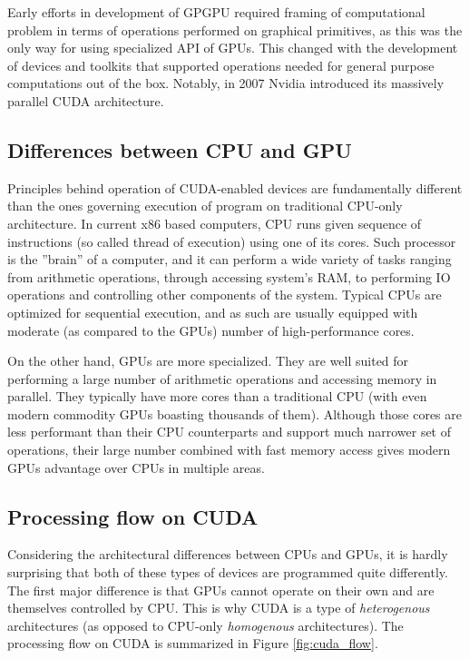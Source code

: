 Early efforts in development of GPGPU required framing of computational problem in terms of operations performed on graphical primitives, as this was the only way for using specialized API of GPUs. This changed with the development of devices and toolkits that supported operations needed for general purpose computations out of the box. Notably, in 2007 Nvidia introduced its massively parallel CUDA architecture.

\subsection{Differences between CPU and GPU}
Principles behind operation of CUDA-enabled devices are fundamentally different than the ones governing execution of program on traditional CPU-only architecture. In current x86 based computers, CPU runs given sequence of instructions (so called thread of execution) using one of its cores. Such processor is the ''brain'' of a computer, and it can perform a wide variety of tasks ranging from arithmetic operations, through accessing system's RAM, to performing IO operations and controlling other components of the system. Typical CPUs are optimized for sequential execution, and as such are usually equipped with moderate (as compared to the GPUs) number of high-performance cores. 

On the other hand, GPUs are more specialized. They are well suited for performing a large number of arithmetic operations and accessing memory in parallel. They typically have more cores than a traditional CPU (with even modern commodity GPUs boasting thousands of them). Although those cores are less performant than their CPU counterparts and support much narrower set of operations, their large number combined with fast memory access gives modern GPUs advantage over CPUs in multiple areas.

\subsection{Processing flow on CUDA}
Considering the architectural differences between CPUs and GPUs, it is hardly surprising that both of these types of devices are programmed quite differently. The first major difference is that GPUs cannot operate on their own and are themselves controlled by CPU. This is why CUDA is a type of \emph{heterogenous} architectures (as opposed to CPU-only \emph{homogenous} architectures). The processing flow on CUDA is summarized in Figure \ref{fig:cuda_flow}.

